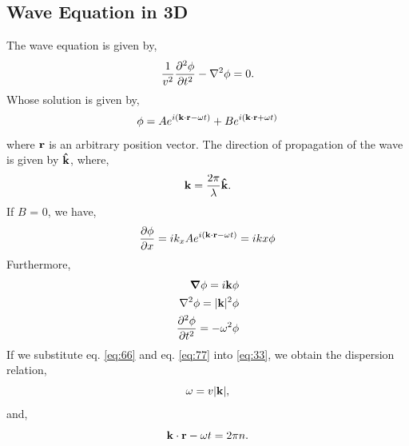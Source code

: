 \documentclass{book}
\begin{document}
\subsection{Wave Equation in 3D}
The wave equation is given by,
\begin{equation}
	\frac{1}{v^2} \pdv[2]{\phi}{t} - \laplacian{\phi} = 0. \label{eq:33}
\end{equation}
Whose solution is given by,
\begin{equation}
	\phi = Ae^{i(\vb{k}\cdot\vb{r} - \omega t)} + B e^{i(\vb{k}\cdot\vb{r} + \omega t)}
\end{equation}
where $\vb{r}$ is an arbitrary position vector. The direction of propagation of the wave is given by $\vu{k}$, where,
\begin{equation}
	\vb{k} = \frac{2\pi}{\lambda}\vu{k}.
\end{equation}
If $B$ = 0, we have,
\begin{equation}
	\pdv{\phi}{x} = ik_x Ae^{i(\vb{k}\cdot{\vb{r}} - \omega t)} = ikx \phi \label{eq:44}
\end{equation}
Furthermore,
\begin{align}
	\grad \phi = i\vb{k}\phi \label{eq:55}\\
	\laplacian \phi = |\vb{k}|^2 \phi \label{eq:66}\\
	\pdv[2]{\phi}{t} = - \omega^2 \phi \label{eq:77}
\end{align}
If we substitute eq. \eqref{eq:66} and eq. \eqref{eq:77} into \eqref{eq:33}, we obtain the dispersion relation,
\begin{equation}
	\omega = v|\vb{k}|,
\end{equation}
and,
\begin{equation}
	\vb{k}\cdot\vb{r} - \omega t = 2\pi n.
\end{equation}
\end{document}
